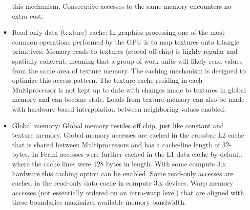 \begin{itemize}
 this mechanism. Consecutive accesses to the same memory encounters no extra cost.
 \item Read-only data (texture) cache: In graphics processing one of the most common operations performed by the GPU is to map textures onto triangle primitives. 
 Memory reads to textures (stored off-chip) is highly regular and spatially coherent, meaning that a group of work units will likely read values from the same area of texture
 memory. The caching mechanism is designed to optimize this access pattern. The texture cache residing in each Multiprocessor is not kept up to date with changes made to
 textures in global memory and can become stale. Loads from texture memory can also be made with hardware-based interpolation between neighboring values enabled.
 \item Global memory: Global memory resides off chip, just like constant and texture memory. Global memory accesses are cached in the crossbar L2 cache that 
 is shared between Multiprocessors and has a cache-line length of 32-bytes. In Fermi accesses were further cached in the L1
 data cache by default, where the cache lines were 128 bytes in length. With some compute 3.x hardware this caching option can be enabled. Some read-only 
 accesses are cached in the read-only data cache in compute 3.x devices. Warp memory accesses (not essentially ordered on an intra-warp level) that are aligned 
 with these boundaries maximizes available memory bandwidth.
\end{itemize}
